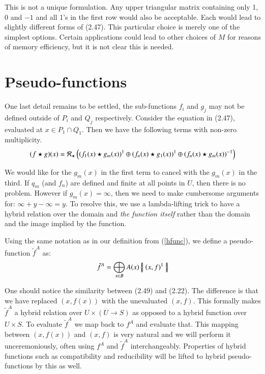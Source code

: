 This is not a unique formulation.
Any upper triangular matrix containing only 1, 0 and $-1$ and all 1's in the first row would also be acceptable.
Each would lead to slightly different forms of (2.47). This particular choice is merely one of the simplest options. 
Certain applications could lead to other choices of $M$ for reasons of memory efficiency, but it is not clear this is needed.

%
%
\section{Pseudo-functions}

One last detail remains to be settled, the sub-functions $f_i$ and $g_j$ may not be defined outside of 
$P_i$ and $Q_j$ respectively.
Consider the equation in (2.47), evaluated at $x \in P_1 \cap Q_1$.
Then we have the following terms with non-zero multiplicity.
\begin{equation}
	(f \star g)(x) = \mathcal{R}_\star 
		\left(   (f_1(x) \star g_m(x))^1 \oplus 
				(f_n(x) \star g_1(x))^1 \oplus 
				(f_n(x) \star g_m(x))^{-1} 
		\right)
\end{equation}


We would like for the $g_m(x)$ in the first term to cancel with the $g_m(x)$ in the third.
If $q_m$ (and $f_n$) are defined and finite at all points in $U$, then there is no problem.
However if $g_m(x)=\infty$, then we need to make cumbersome arguments for: $ \infty + y - \infty = y$.
To resolve this, we use a lambda-lifting trick to have a hybrid relation over the domain and \emph{the function itself}
rather than the domain and the image implied by the function.


\begin{definition}
	Using the same notation as in our definition from (\ref{hfunc}), we define a pseudo-function $\tilde{f}^A$ as:
	\begin{equation}
 		\tilde{f}^A = \bigoplus_{x \in B} A(x) \left\{ \! \left| \; (x,f)^1 \; \right| \! \right\}
	\end{equation}
\end{definition}


One should notice the similarity between (2.49) and (2.22).
The difference is that we have replaced $(x, f(x))$ with the unevaluated $(x,f)$.
This formally makes $\tilde{f}^A$ a hybrid relation over $U \times (U \to S)$ as opposed to 
a hybrid function over $U \times S$.
To evaluate $\tilde{f}^A$ we map back to $f^A$ and evaluate that.
This mapping between $(x,f(x))$ and $(x,f)$ is very natural and we will perform it unceremoniously,
often using $f^A$ and $\tilde{f}^A$ interchangeably. 
Properties of hybrid functions such as compatibility and reducibility will be lifted to hybrid pseudo-functions by this as well.


